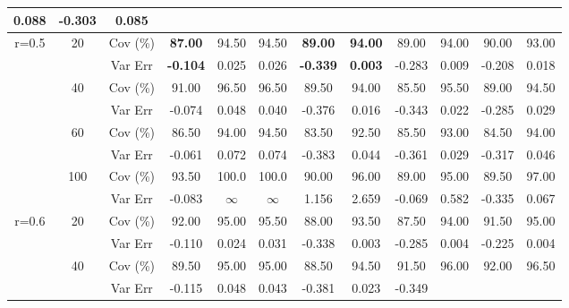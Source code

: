 \begin{table}[!t]
{\begin{tabular}{|c|c|c|c|cccccccc|}
\multicolumn{1}{c|}{0.088} &
-0.303 &
0.085 \\ \hline
\multirow{8}{*}{r=0.5} &
\multirow{2}{*}{20} &
Cov (\%) &
\textbf{87.00} &
94.50 &
\multicolumn{1}{c|}{94.50} &
\textbf{89.00} &
\multicolumn{1}{c|}{\textbf{94.00}} &
89.00 &
\multicolumn{1}{c|}{94.00} &
90.00 &
93.00 \\
&
&
Var Err &
\textbf{-0.104} &
0.025 &
\multicolumn{1}{c|}{0.026} &
\textbf{-0.339} &
\multicolumn{1}{c|}{\textbf{0.003}} &
-0.283 &
\multicolumn{1}{c|}{0.009} &
-0.208 &
0.018 \\ \cline{2-12} 
&
\multirow{2}{*}{40} &
Cov (\%) &
91.00 &
96.50 &
\multicolumn{1}{c|}{96.50} &
89.50 &
\multicolumn{1}{c|}{94.00} &
85.50 &
\multicolumn{1}{c|}{95.50} &
89.00 &
94.50 \\
&
&
Var Err &
-0.074 &
0.048 &
\multicolumn{1}{c|}{0.040} &
-0.376 &
\multicolumn{1}{c|}{0.016} &
-0.343 &
\multicolumn{1}{c|}{0.022} &
-0.285 &
0.029 \\ \cline{2-12} 
&
\multirow{2}{*}{60} &
Cov (\%) &
86.50 &
94.00 &
\multicolumn{1}{c|}{94.50} &
83.50 &
\multicolumn{1}{c|}{92.50} &
85.50 &
\multicolumn{1}{c|}{93.00} &
84.50 &
94.00 \\
&
&
Var Err &
-0.061 &
0.072 &
\multicolumn{1}{c|}{0.074} &
-0.383 &
\multicolumn{1}{c|}{0.044} &
-0.361 &
\multicolumn{1}{c|}{0.029} &
-0.317 &
0.046 \\ \cline{2-12} 
&
\multirow{2}{*}{100} &
Cov (\%) &
93.50 &
100.0 &
\multicolumn{1}{c|}{100.0} &
90.00 &
\multicolumn{1}{c|}{96.00} &
89.00 &
\multicolumn{1}{c|}{95.00} &
89.50 &
97.00 \\
&
&
Var Err &
-0.083 &
$\infty$ &
\multicolumn{1}{c|}{$\infty$} &
1.156 &
\multicolumn{1}{c|}{2.659} &
-0.069 &
\multicolumn{1}{c|}{0.582} &
-0.335 &
0.067 \\ \hline
\multirow{8}{*}{r=0.6} &
\multirow{2}{*}{20} &
Cov (\%) &
92.00 &
95.00 &
\multicolumn{1}{c|}{95.50} &
88.00 &
\multicolumn{1}{c|}{93.50} &
87.50 &
\multicolumn{1}{c|}{94.00} &
91.50 &
95.00 \\
&
&
Var Err &
-0.110 &
0.024 &
\multicolumn{1}{c|}{0.031} &
-0.338 &
\multicolumn{1}{c|}{0.003} &
-0.285 &
\multicolumn{1}{c|}{0.004} &
-0.225 &
0.004 \\ \cline{2-12} 
&
\multirow{2}{*}{40} &
Cov (\%) &
89.50 &
95.00 &
\multicolumn{1}{c|}{95.00} &
88.50 &
\multicolumn{1}{c|}{94.50} &
91.50 &
\multicolumn{1}{c|}{96.00} &
92.00 &
96.50 \\
&
&
Var Err &
-0.115 &
0.048 &
\multicolumn{1}{c|}{0.043} &
-0.381 &
\multicolumn{1}{c|}{0.023} &
-0.349 &

\end{tabular}}
\end{table}
